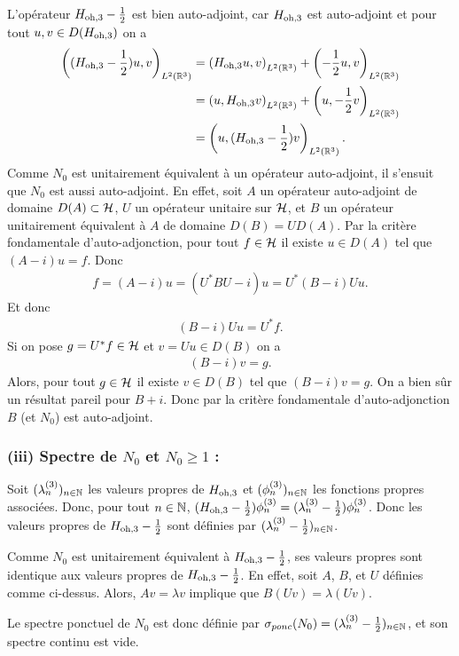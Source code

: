 L'opérateur $H_\text{oh,3} - \frac{1}{2}$ est bien auto-adjoint, car $H_\text{oh,3}$ est
auto-adjoint et pour tout $u,v \in D(H_\text{oh,3})$ on a
\begin{align}
    \left( (H_\text{oh,3} - \frac{1}{2})u, v \right)_{L^2(\mathbb{R}^3)} &= \left( H_\text{oh,3} u, v \right)_{L^2(\mathbb{R}^3)} + \left( -\frac{1}{2} u, v \right)_{L^2(\mathbb{R}^3)} \\
    &= \left( u, H_\text{oh,3} v \right)_{L^2(\mathbb{R}^3)} + \left( u, -\frac{1}{2} v \right)_{L^2(\mathbb{R}^3)} \\
    &= \left( u, (H_\text{oh,3} - \frac{1}{2})v \right)_{L^2(\mathbb{R}^3)}.
\end{align}
%
Comme $N_0$ est unitairement équivalent à un opérateur auto-adjoint,
il s'ensuit que $N_0$ est aussi auto-adjoint. En effet, soit
$A$ un opérateur auto-adjoint de domaine $D(A) \subset \mathcal{H}$,
$U$ un opérateur unitaire sur $\mathcal{H}$, et $B$ un opérateur
unitairement équivalent à $A$ de domaine $D(B) = U D(A)$.
Par la critère fondamentale d'auto-adjonction, pour tout
$f \in \mathcal{H}$ il existe $u \in D(A)$ tel que $(A - i)u = f$.
Donc
\begin{align}
    f = (A - i)u = (U^* B U - i)u = U^* (B - i)U u.
\end{align}
%
Et donc
\begin{align}
    (B - i)U u = U^* f.
\end{align}
%
Si on pose $g = U^* f \in \mathcal{H}$ et $v = U u \in D(B)$ on a
\begin{align}
    (B - i)v = g.
\end{align}
%
Alors, pour tout $g \in \mathcal{H}$ il existe $v \in D(B)$ tel que
$(B - i)v = g$. On a bien sûr un résultat pareil pour $B + i$.
Donc par la critère fondamentale d'auto-adjonction $B$ (et $N_0$)
est auto-adjoint.

\subsubsection*{(iii) Spectre de $N_0$ et $N_0 \geqslant 1$ :}

Soit $(\lambda_n^{(3)})_{n \in \mathbb{N}}$ les valeurs propres de $H_\text{oh,3}$ et
$(\phi_n^{(3)})_{n \in \mathbb{N}}$ les fonctions propres associées.
Donc, pour tout $n \in \mathbb{N}$,
$(H_\text{oh,3} - \frac{1}{2}) \phi_n^{(3)} = (\lambda_n^{(3)} - \frac{1}{2}) \phi_n^{(3)}$.
Donc les valeurs propres de $H_\text{oh,3} - \frac{1}{2}$ sont définies par
$(\lambda_n^{(3)} - \frac{1}{2})_{n \in \mathbb{N}}$.

Comme $N_0$ est unitairement équivalent à $H_\text{oh,3} - \frac{1}{2}$,
ses valeurs propres sont identique aux valeurs propres de $H_\text{oh,3} - \frac{1}{2}$.
En effet, soit $A$, $B$, et $U$ définies comme ci-dessus. Alors,
$Av = \lambda v$ implique que $B (Uv) = \lambda (Uv)$.

Le spectre ponctuel de $N_0$ est donc définie par
$\sigma_{ponc}(N_0) = (\lambda_n^{(3)} - \frac{1}{2})_{n \in \mathbb{N}}$, et
son spectre continu est vide.

